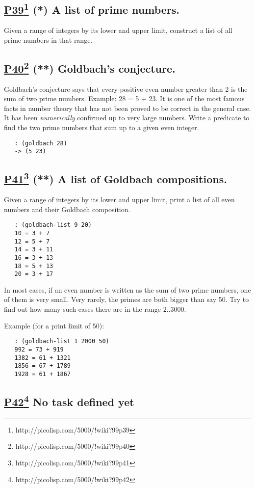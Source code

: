 \documentclass[10pt,a4paper]{article}
\begin{document}
\subsection*{\underline{P39}\footnote{http://picolisp.com/5000/!wiki?99p39} (*) A list of prime numbers.}
Given a range of integers by its lower and upper limit, construct
a list of all prime numbers in that range.

\subsection*{\underline{P40}\footnote{http://picolisp.com/5000/!wiki?99p40} (**) Goldbach's conjecture.}
Goldbach's conjecture says that every positive even number
greater than 2 is the sum of two prime numbers. Example: 28 = 5 + 23.
It is one of the most famous facts in number theory that has not
been proved to be correct in the general case.
It has been \textit{numerically} confirmed up to very large numbers.
Write a predicate to find the two prime numbers
that sum up to a given even integer.
\begin{verbatim}
   : (goldbach 28)
   -> (5 23)
\end{verbatim}


\subsection*{\underline{P41}\footnote{http://picolisp.com/5000/!wiki?99p41} (**) A list of Goldbach compositions.}
Given a range of integers by its lower and upper limit, print
a list of all even numbers and their Goldbach composition.
\begin{verbatim}
   : (goldbach-list 9 20)
   10 = 3 + 7
   12 = 5 + 7
   14 = 3 + 11
   16 = 3 + 13
   18 = 5 + 13
   20 = 3 + 17
\end{verbatim}

In most cases, if an even number is written as the sum of two
prime numbers, one of them is very small. Very rarely, the primes
are both bigger than say 50. Try to find out how many such cases
there are in the range 2..3000.

Example (for a print limit of 50):
\begin{verbatim}
   : (goldbach-list 1 2000 50)
   992 = 73 + 919
   1382 = 61 + 1321
   1856 = 67 + 1789
   1928 = 61 + 1867
\end{verbatim}


\subsection*{\underline{P42}\footnote{http://picolisp.com/5000/!wiki?99p42} No task defined yet}
\end{document}
